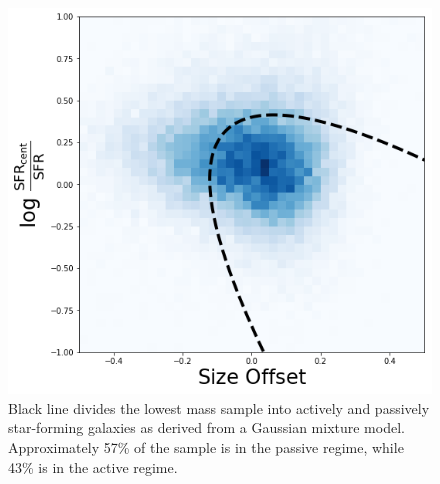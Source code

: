 \documentclass[iop]{emulateapj}
\begin{document}
\begin{figure}
	\centering
	\includegraphics[width=1. \columnwidth]{GMM.png}
	\caption{Black line divides the lowest mass sample into actively and passively star-forming galaxies as derived from a Gaussian mixture model. Approximately 57\% of the sample is in the passive regime, while 43\% is in the active regime.}
	\label{fig:HA_duty}
	
\end{figure}
\end{document}
